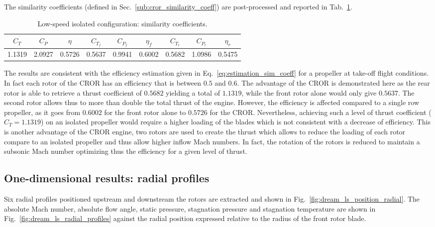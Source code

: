 The similarity coefficients (defined in 
Sec.~\ref{sub:cror_similarity_coeff}) are post-processed 
and reported in Tab.~\ref{tab:dream_ls_sim_coeff}.
\begin{table}[htp]
   \centering
  \begin{tabular}{ccc|cccccc}
    \toprule
    $C_T$ & $C_P$ & $\eta$ & $C_{T_f}$ & $C_{P_f}$ & $\eta_f$ & $C_{T_r}$ & $C_{P_r}$ & $\eta_r$ \\
    \midrule
    1.1319 & 2.0927 & 0.5726 & 0.5637 & 0.9941 &  0.6002 & 0.5682 & 1.0986 &  0.5475 \\
    \bottomrule
  \end{tabular}
  \caption{Low-speed isolated configuration: similarity coefficients.}
  \label{tab:dream_ls_sim_coeff}
\end{table}
The results are consistent with the efficiency estimation given in 
Eq.~\eqref{eq:estimation_sim_coeff} for a propeller at take-off flight conditions.
In fact each rotor of the CROR has an efficiency that is between $0.5$
and $0.6$. The advantage of the CROR is demonstrated here as the rear
rotor is able to retrieve a thrust coefficient of $0.5682$ yielding
a total of $1.1319$, while
the front rotor alone would only give $0.5637$.
The second rotor allows thus to more than double the total thrust of the engine.
However, the efficiency is affected compared to a single row 
propeller, as
it goes from $0.6002$ for the front rotor alone to $0.5726$ for the CROR.
Nevertheless, achieving such a level of thrust coefficient ($C_T = 1.1319$)
on an isolated
propeller would require a higher loading of the blades which is not
consistent with a decrease of efficiency.
This is another advantage 
of the CROR engine, two rotors are used to create the thrust which allows to
reduce the loading of each rotor compare to an isolated propeller and thus
allow higher inflow Mach numbers. In fact, the rotation of the rotors is reduced 
to maintain a subsonic Mach number optimizing thus the efficiency
for a given level of thrust.


\subsection{One-dimensional results: radial profiles}
\label{sub:dream_ls_radial_profiles}

Six radial profiles positioned upstream and downstream the rotors
are extracted and shown in Fig.~\ref{fig:dream_ls_position_radial}.
The absolute
Mach number, absolute flow angle, static pressure, 
stagnation pressure and stagnation temperature
are shown in Fig.~\ref{fig:dream_ls_radial_profiles}
against the radial position expressed
relative to the radius of the front rotor blade.

